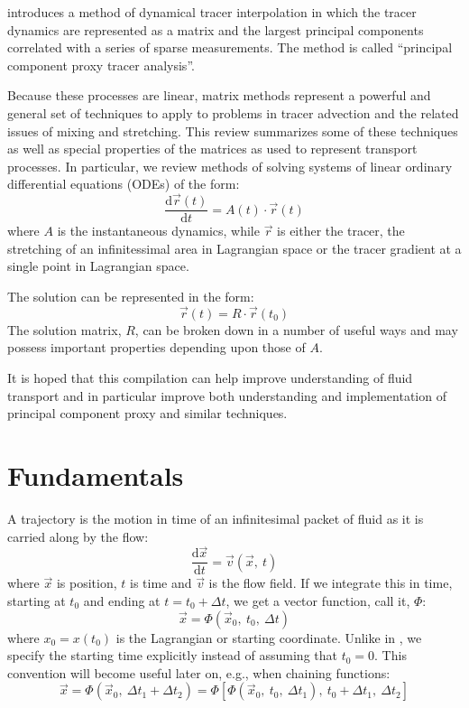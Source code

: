 \documentclass[11pt]{article}
\begin{document}
\citet{Mills2012} introduces a method of dynamical tracer interpolation
in which the tracer dynamics are represented as a matrix and the largest
principal components correlated with a series of sparse measurements.
The method is called ``principal component proxy tracer analysis''.

Because these processes are linear, matrix methods represent a powerful and
general set of techniques to apply to problems in tracer advection and the
related issues of mixing and stretching.
This review summarizes some of these techniques as well as special properties
of the matrices as used to represent transport processes.  In particular, 
we review methods of solving systems of linear ordinary differential
equations (ODEs) of the form:
\begin{equation}
\frac{\mathrm d \vec r(t)}{\mathrm d t} = A(t) \cdot \vec r(t)
\end{equation}
where $A$ is the instantaneous dynamics, while $\vec r$ is either the tracer,
the stretching of an infinitessimal area in Lagrangian space or the tracer gradient at a single point
in Lagrangian space. 

The solution can be represented in the form:
\begin{equation}
\vec r(t)=R \cdot \vec r(t_0)
\end{equation}
The solution matrix, $R$, can be broken down in a number of useful ways
and may possess important properties depending upon those of $A$.  

It is hoped that this compilation
can help improve understanding of fluid transport and in particular 
improve both understanding and implementation of principal component
proxy and similar techniques.

\section{Fundamentals}

A trajectory is the motion in time of an infinitesimal packet of fluid
as it is carried along by the flow:
\begin{equation}
\frac{\mathrm d \vec x}{\mathrm d t}=\vec v(\vec x,~t)
\end{equation}
where $\vec x$ is position, $t$ is time and $\vec v$ is the flow field.
If we integrate this in time, starting at $t_0$ and ending at $t=t_0+\Delta t$, we get a
vector function, call it, $\Phi$:
\begin{equation}
\vec x=\Phi(\vec x_0,~t_0,~\Delta t)
\label{traj_def}
\end{equation}
where $x_0=x(t_0)$ is the Lagrangian or starting coordinate.
Unlike in \citet{Ottino1989}, we specify the starting time explicitly instead 
of assuming that $t_0=0$.  This convention will become useful later on, e.g., 
when chaining functions:
\begin{equation}
\vec x=\Phi(\vec x_0,~\Delta t_1+\Delta t_2)=\Phi[\Phi(\vec x_0,~t_0,~\Delta t_1),~t_0 + \Delta t_1,~\Delta t_2]
\end{equation}
\end{document}
